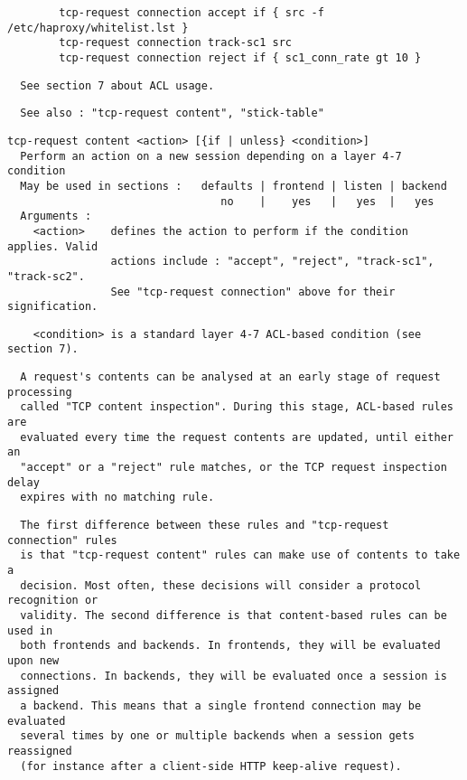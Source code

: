 \begin{verbatim}
        tcp-request connection accept if { src -f /etc/haproxy/whitelist.lst }
        tcp-request connection track-sc1 src
        tcp-request connection reject if { sc1_conn_rate gt 10 }
\end{verbatim}

\begin{verbatim}
  See section 7 about ACL usage.
\end{verbatim}

\begin{verbatim}
  See also : "tcp-request content", "stick-table"
\end{verbatim}

\begin{verbatim}
tcp-request content <action> [{if | unless} <condition>]
  Perform an action on a new session depending on a layer 4-7 condition
  May be used in sections :   defaults | frontend | listen | backend
                                 no    |    yes   |   yes  |   yes
  Arguments :
    <action>    defines the action to perform if the condition applies. Valid
                actions include : "accept", "reject", "track-sc1", "track-sc2".
                See "tcp-request connection" above for their signification.
\end{verbatim}

\begin{verbatim}
    <condition> is a standard layer 4-7 ACL-based condition (see section 7).
\end{verbatim}

\begin{verbatim}
  A request's contents can be analysed at an early stage of request processing
  called "TCP content inspection". During this stage, ACL-based rules are
  evaluated every time the request contents are updated, until either an
  "accept" or a "reject" rule matches, or the TCP request inspection delay
  expires with no matching rule.
\end{verbatim}

\begin{verbatim}
  The first difference between these rules and "tcp-request connection" rules
  is that "tcp-request content" rules can make use of contents to take a
  decision. Most often, these decisions will consider a protocol recognition or
  validity. The second difference is that content-based rules can be used in
  both frontends and backends. In frontends, they will be evaluated upon new
  connections. In backends, they will be evaluated once a session is assigned
  a backend. This means that a single frontend connection may be evaluated
  several times by one or multiple backends when a session gets reassigned
  (for instance after a client-side HTTP keep-alive request).
\end{verbatim}

